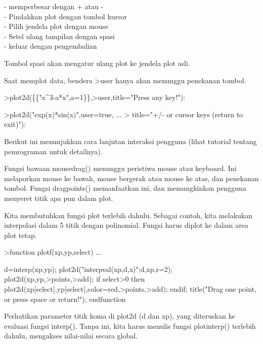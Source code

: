 \documentclass[a4paper,10pt]{article}
\begin{document}
\begin{eulernotebook}
\begin{eulercomment}
\begin{eulercomment}
\begin{eulercomment}
\begin{eulercomment}
\begin{eulercomment}
- memperbesar dengan + atau -\\
- Pindahkan plot dengan tombol kursor\\
- Pilih jendela plot dengan mouse\\
- Setel ulang tampilan dengan spasi\\
- keluar dengan pengembalian

Tombol spasi akan mengatur ulang plot ke jendela plot asli.

Saat memplot data, bendera \textgreater{}user hanya akan menunggu penekanan tombol.
\end{eulercomment}
\begin{eulerprompt}
>plot2d(\{\{"x^3-a*x",a=1\}\},>user,title="Press any key!"):
\end{eulerprompt}
\begin{eulerprompt}
>plot2d("exp(x)*sin(x)",user=true, ...
>  title="+/- or cursor keys (return to exit)"):
\end{eulerprompt}
\begin{eulercomment}
Berikut ini menunjukkan cara lanjutan interaksi pengguna (lihat
tutorial tentang pemrograman untuk detailnya).

Fungsi bawaan mousedrag() menunggu peristiwa mouse atau keyboard. Ini
melaporkan mouse ke bawah, mouse bergerak atau mouse ke atas, dan
penekanan tombol. Fungsi dragpoints() memanfaatkan ini, dan
memungkinkan pengguna menyeret titik apa pun dalam plot.

Kita membutuhkan fungsi plot terlebih dahulu. Sebagai contoh, kita
melakukan interpolasi dalam 5 titik dengan polinomial. Fungsi harus
diplot ke dalam area plot tetap.
\end{eulercomment}
\begin{eulerprompt}
>function plotf(xp,yp,select) ...
\end{eulerprompt}
\begin{eulerudf}
    d=interp(xp,yp);
    plot2d("interpval(xp,d,x)";d,xp,r=2);
    plot2d(xp,yp,>points,>add);
    if select>0 then
      plot2d(xp[select],yp[select],color=red,>points,>add);
    endif;
    title("Drag one point, or press space or return!");
  endfunction
\end{eulerudf}
\begin{eulercomment}
Perhatikan parameter titik koma di plot2d (d dan xp), yang diteruskan
ke evaluasi fungsi interp(). Tanpa ini, kita harus menulis fungsi
plotinterp() terlebih dahulu, mengakses nilai-nilai secara global.


\end{eulercomment}
\end{eulercomment}
\end{eulercomment}
\end{eulercomment}
\end{eulercomment}
\end{eulernotebook}
\end{document}
